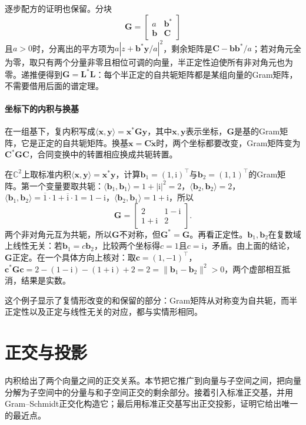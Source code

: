 逐步配方的证明也保留。分块
\[
 \bm G=\begin{bmatrix}a&\bm b^*\\\bm b&\bm C\end{bmatrix}
\]
且$a>0$时，分离出的平方项为$a|z+\bm b^*\bm y/a|^2$，剩余矩阵是$\bm C-\bm b\bm b^*/a$；若对角元全为零，取只有两个分量非零且相位可调的向量，半正定性迫使所有非对角元也为零。递推便得到$\bm G=\bm L^*\bm L$：每个半正定的自共轭矩阵都是某组向量的Gram矩阵，不需要借用后面的谱定理。

\paragraph{坐标下的内积与换基}
在一组基下，复内积写成$\langle\bm x,\bm y\rangle=\bm x^*\bm G\bm y$，其中$\bm x,\bm y$表示坐标，$\bm G$是基的Gram矩阵，它是正定的自共轭矩阵。换基$\bm x=\bm C\widetilde{\bm x}$时，两个坐标都要改变，Gram矩阵变为$\bm C^*\bm G\bm C$，合同变换中的转置相应换成共轭转置。
\begin{example}[复空间中的Gram矩阵]
\label{ex:ls-complex-gram}
在$\mathbb C^2$上取标准内积$\langle\bm x,\bm y\rangle=\bm x^*\bm y$，计算$\bm b_1=(1,\mathrm i)^\top$与$\bm b_2=(1,1)^\top$的Gram矩阵。第一个变量要取共轭：$\langle\bm b_1,\bm b_1\rangle=1+|\mathrm i|^2=2$，$\langle\bm b_2,\bm b_2\rangle=2$，$\langle\bm b_1,\bm b_2\rangle=\overline1\cdot1+\overline{\mathrm i}\cdot1=1-\mathrm i$，$\langle\bm b_2,\bm b_1\rangle=1+\mathrm i$，所以
\[
 \bm G=\begin{bmatrix}2&1-\mathrm i\\1+\mathrm i&2\end{bmatrix}.
\]
两个非对角元互为共轭，所以$\bm G$不对称，但$\bm G^*=\bm G$。再看正定性。$\bm b_1,\bm b_2$在复数域上线性无关：若$\bm b_1=c\bm b_2$，比较两个坐标得$c=1$且$c=\mathrm i$，矛盾。由上面的结论，$\bm G$正定。在一个具体方向上核对：取$\bm c=(1,-1)^\top$，$\bm c^*\bm G\bm c=2-(1-\mathrm i)-(1+\mathrm i)+2=2=\lVert\bm b_1-\bm b_2\rVert^2>0$，两个虚部相互抵消，结果是实数。

这个例子显示了复情形改变的和保留的部分：Gram矩阵从对称变为自共轭，而半正定性以及正定与线性无关的对应，都与实情形相同。
\end{example}

\section{正交与投影}
\label{sec:ls-orthogonality-and-projection}

内积给出了两个向量之间的正交关系。本节把它推广到向量与子空间之间，把向量分解为子空间中的分量与和子空间正交的剩余部分。接着引入标准正交基，并用Gram--Schmidt正交化构造它；最后用标准正交基写出正交投影，证明它给出唯一的最近点。

